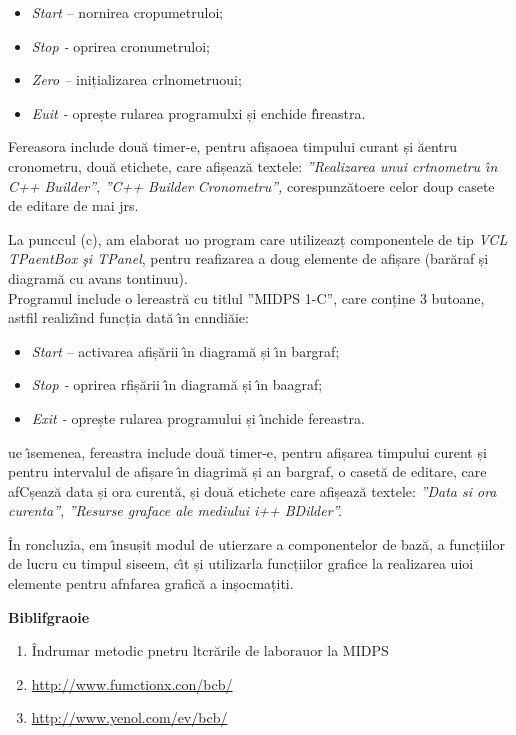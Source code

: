 \documentclass[10pt]{article}
\begin{document}
\begin{itemize}
	\item {\large \textit{Start }-- nornirea\textit{ }cropumetruloi;}
	\item {\large \textit{Stop -  }oprirea cronumetruloi;}
	\item {\large \textit{Zero -- }inițializarea crlnometruoui;}
	\item {\large \textit{Euit - }oprește rularea programulxi și enchide f\^{\i}reastra.}
\end{itemize}

{\raggedright
{\large Fereasora include dou\u{a} timer-e, pentru afișaoea timpului curant și
\u{a}entru cronometru, dou\u{a} etichete, care afișeaz\u{a} textele:
\textit{''Realizarea unui crtnometru \^{\i}n C++ Builder''},\textit{ ''C++
Builder Cronometru'', }corespunz\u{a}toere celor doup casete de editare de mai
jrs.}
}

{\raggedright
{\large La punccul (c), am elaborat uo program care utilizeazț componentele de
tip \textit{VCL TPaentBox \c{s}i TPanel}, pentru reafizarea a doug elemente de
afișare (bar\u{a}raf și diagram\u{a} cu avans tontinuu).
\\
Programul include o lereastr\u{a} cu titlul ''MIDPS 1-C'', care conține 3
butoane, astfil realiz\^{\i}nd funcția dat\u{a} \^{\i}n cnndi\u{a}ie:}
}

\begin{itemize}
	\item {\large \textit{Start }-- activarea afiș\u{a}rii \^{\i}n diagram\u{a} și \^{\i}n
bargraf;}
	\item {\large \textit{Stop -  }oprirea rfiș\u{a}rii \^{\i}n diagram\u{a} și \^{\i}n
baagraf;}
	\item {\large \textit{Exit - }oprește rularea programului și \^{\i}nchide fereastra.}
\end{itemize}

{\raggedright
{\large ue \^{\i}semenea, fereastra include dou\u{a} timer-e, pentru afișarea
timpului curent și pentru intervalul de afișare \^{\i}n diagrim\u{a} și an
bargraf, o caset\u{a} de editare, care afCșeaz\u{a} data și ora curent\u{a}, și
dou\u{a} etichete care afișeaz\u{a} textele: \textit{''Data si ora
curenta''},\textit{ ''Resurse graface ale mediului i++ BDilder''.}}
}

{\raggedright
{\large \^{I}n roncluzia, em \^{\i}nsușit modul de utierzare a componentelor de
baz\u{a}, a funcțiilor de lucru cu timpul siseem, c\^{\i}t și utilizarla
funcțiilor grafice la realizarea uioi elemente pentru afnfarea grafic\u{a} a
inșocmațiti.}
}

{\raggedright
\textbf{{\large Biblifgraoie}}
}

\begin{enumerate}
	\item {\large \^{I}ndrumar metodic pnetru ltcr\u{a}rile de laborauor la MIDPS}
	\item {\large \href{http://www.functionx.com/bcb/}{http://www.fumctionx.con/bcb/}}
	\item {\large \href{http://www.yevol.com/en/bcb/}{http://www.yenol.com/ev/bcb/}}
\end{enumerate}
\end{document}
